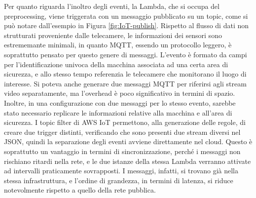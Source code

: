 
Per quanto riguarda l'inoltro degli eventi, la Lambda, che si occupa del preprocessing, viene triggerata con un messaggio pubblicato su un topic, come si può notare dall'esempio in Figura \ref{fig:IoT-publish}. Rispetto al flusso di dati non strutturati proveniente dalle telecamere, le informazioni dei sensori sono estrememante minimali, in quanto MQTT, essendo un protocollo leggero, è soprattutto pensato per questo genere di messaggi. L'evento è formato da campi per l'identificazione univoca della macchina associata ad una certa area di sicurezza, e allo stesso tempo referenzia le telecamere che monitorano il luogo di interesse. Si poteva anche generare due messaggi MQTT per riferirsi agli stream video separatamente, ma l'overhead è poco significativo in termini di spazio. Inoltre, in una configurazione con due messaggi per lo stesso evento, sarebbe stato necessario replicare le informazioni relative alla macchina e all'area di sicurezza. I topic filter di AWS IoT permettono, alla generazione delle regole, di creare due trigger distinti, verificando che sono presenti due stream diversi nel JSON, quindi la separazione degli eventi avviene direttamente nel cloud. Questo è soprattutto un vantaggio in termini di sincronizzazione, perché i messaggi non rischiano ritardi nella rete, e le due istanze della stessa Lambda verranno attivate ad intervalli praticamente sovrapposti. I messaggi, infatti, si trovano già nella stessa infrastruttura, e l'ordine di grandezza, in termini di latenza, si riduce notevolmente rispetto a quello della rete pubblica. %
